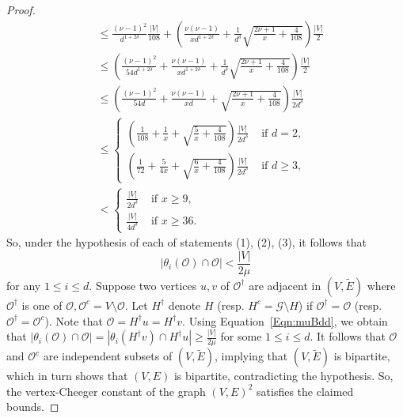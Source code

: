 \documentclass[ALCO,Unicode,published]{cedram}
\newcommand{\calG}{\ensuremath{\mathcal{G}}}
\newcommand{\calO}{\ensuremath{\mathcal{O}}}
\begin{document}
\begin{proof}
\begin{align*}
& \leq \frac{(\nu -1)^2}{d^{1 + 2\delta}} \frac{|V|}{108} + \left(\frac {\nu(\nu -1)}{xd^{1 + 2\delta}} + \frac 1 {d^{\delta}}\sqrt{\frac{ 2\nu + 1 }{x}
+
\frac{4}{108}
}\right) \frac{|V|}{2} \\
& \leq \left(\frac{(\nu -1)^2}{54 d^{1 + 2\delta}} + \frac {\nu(\nu -1)}{xd^{1 + 2\delta}} + \frac 1 {d^{\delta}}\sqrt{\frac{ 2\nu + 1 }{x}
+
\frac{4}{108}
}\right) \frac{|V|}{2} \\
& \leq \left(\frac{(\nu -1)^2}{54 d} + \frac {\nu(\nu -1)}{xd} + \sqrt{\frac{ 2\nu + 1 }{x}
+
\frac{4}{108}
}\right) \frac{|V|}{2d^{\delta}} \\
& 
\leq 
\begin{cases}
\left(\frac 1{108}+ \frac {1}{x} + \sqrt{\frac{ 5 }{x}
+
\frac{4}{108}
}\right) \frac{|V|}{2 d^{\delta}} 
& \text{ if } d =2, \\
\left(\frac 1{72} + \frac {5}{4x} + \sqrt{\frac{6}{x}
+
\frac{4}{108}
}\right) \frac{|V|}{2 d^{\delta}} 
& \text{ if } d \geq 3, 
\end{cases}
\\
& 
<
\begin{cases}
 \frac{|V|}{2d^{\delta}} 
& \text{ if } x \geq 9, \\
\frac{|V|}{4d^{\delta}} 
& \text{ if } x \geq 36.
\end{cases}
\end{align*}
So, under the hypothesis of each of statements (1), (2), (3), it follows that 
$$
|\theta_i(\calO)\cap \calO|
< \frac{|V|}{2\mu}
$$
for any $1\leq i \leq d$. Suppose two vertices $u, v$ of $\calO^\dag$ are adjacent in $(V, \widetilde E)$ where $\calO^\dag$ is one of $\calO, \calO^c = V \setminus \calO$. Let $H^\dag$ denote $H$ (resp. $H^c = \calG \setminus H$) if $\calO^\dag  = \calO$ (resp.~$\calO^\dag = \calO^c$). Note that $\calO = H^\dag u = H^\dag v$. Using Equation~\eqref{Eqn:muBdd}, we obtain that 
$
|\theta_i(\calO)\cap \calO|
 = |\theta_i(H^\dag v) \cap H^\dag u | 
 \geq \frac{|V|}{2\mu}
$
for some $1\leq i \leq d$. It follows that $\calO$ and $\calO^c$ are independent subsets of $(V, \widetilde E)$, implying that $(V, \widetilde E)$ is bipartite, which in turn shows that $(V, E)$ is bipartite, contradicting the hypothesis. So, the vertex-Cheeger constant of the graph $(V, E)^2$ satisfies the claimed bounds. 
\end{proof}
\end{document}
